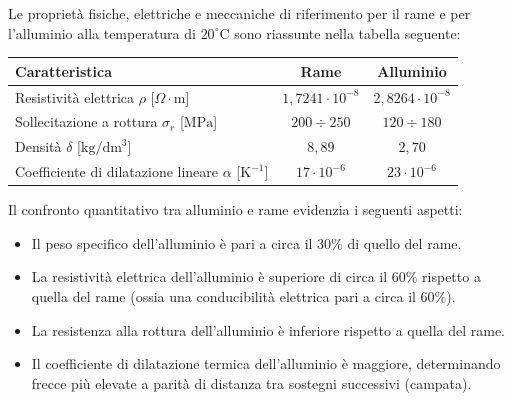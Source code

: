 Le proprietà fisiche, elettriche e meccaniche di riferimento per il rame e per l'alluminio alla temperatura di $20^\circ\text{C}$ sono riassunte nella tabella seguente:

\begin{center}
\begin{tabular}{|l|c|c|}
\hline
\textbf{Caratteristica} & \textbf{Rame} & \textbf{Alluminio} \\
\hline
Resistività elettrica $\rho$ [$\Omega\cdot\text{m}$] & $1{,}7241 \cdot 10^{-8}$ & $2{,}8264 \cdot 10^{-8}$ \\
Sollecitazione a rottura $\sigma_r$ [$\text{MPa}$] & $200 \div 250$ & $120 \div 180$ \\
Densità $\delta$ [$\text{kg}/\text{dm}^3$] & $8{,}89$ & $2{,}70$ \\
Coefficiente di dilatazione lineare $\alpha$ [$\text{K}^{-1}$] & $17 \cdot 10^{-6}$ & $23 \cdot 10^{-6}$ \\
\hline
\end{tabular}
\end{center}

Il confronto quantitativo tra alluminio e rame evidenzia i seguenti aspetti:
\begin{itemize}
    \item Il peso specifico dell'alluminio è pari a circa il $30\%$ di quello del rame.
    \item La resistività elettrica dell'alluminio è superiore di circa il $60\%$ rispetto a quella del rame (ossia una conducibilità elettrica pari a circa il $60\%$).
    \item La resistenza alla rottura dell'alluminio è inferiore rispetto a quella del rame.
    \item Il coefficiente di dilatazione termica dell'alluminio è maggiore, determinando frecce più elevate a parità di distanza tra sostegni successivi (campata).
\end{itemize}

